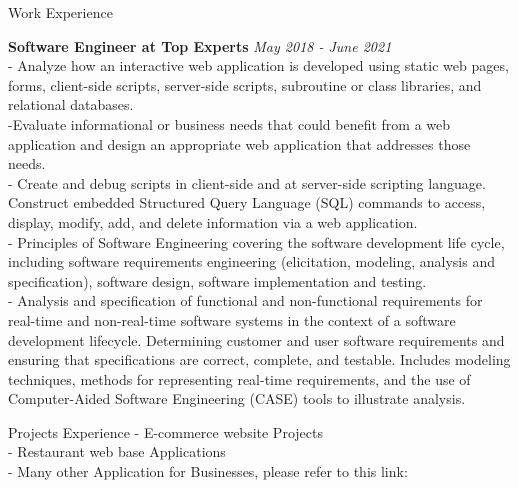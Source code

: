 \documentclass{resume} %
\begin{document}
\begin{rSection}{Work Experience }

{\bf Software Engineer at Top Experts}  \hfill {\em May 2018 - June 2021}
\\- Analyze how an interactive web application is developed using static web pages, forms, client-side scripts,
	server-side scripts, subroutine or class libraries, and relational databases.
\\-Evaluate informational or business needs that could benefit from a web application and design an 
	appropriate web application that addresses those needs. 
\\- Create and debug scripts in client-side and at server-side scripting language. Construct embedded 
	Structured Query Language (SQL) commands to access, display, modify, add, and delete information via 
	a web application.
\\- Principles of Software Engineering covering the software development life cycle, including software 
	requirements engineering (elicitation, modeling, analysis and specification), software design, software 
	implementation and testing.
\\- Analysis and specification of functional and non-functional requirements for real-time and non-real-time 
	software systems in the context of a software development lifecycle. Determining customer and user 
	software requirements and ensuring that specifications are correct, complete, and testable. Includes 
	modeling techniques, methods for representing real-time requirements, and the use of Computer-Aided 
	Software Engineering (CASE) tools to illustrate analysis.




\end{rSection}
\begin{rSection}{Projects Experience}
- E-commerce website Projects \\
- Restaurant web base Applications \\
- Many other Application for Businesses, please refer to this link: 
\end{rSection}
\end{document}
